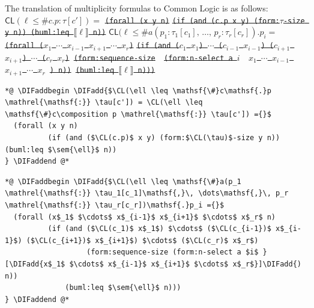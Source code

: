 \documentclass[10pt,fleqn,final]{scrreprt}
\newcommand*{\CL}{\ensuremath{\mathsf{CL}}\xspace}
\newenvironment{definitions}[0]{\medskip }{}
\newcommand{\composition}{\raisebox{0.2pt}{\begin{sideways}\fontsize{6pt}{6pt}\selectfont$\blacklozenge$\end{sideways}}}
\newcommand{\sem}[1]{\mathopen\llbracket#1\mathclose\rrbracket}
\newcommand{\white}[1]{{\color{white}{#1}}}
\newcommand{\qqquad}{\white{x}\qquad}
\providecommand{\DIFadd}[1]{{\protect\color{blue}\uwave{#1}}} %
\providecommand{\DIFdel}[1]{{\protect\color{red}\sout{#1}}}                      %
\providecommand{\DIFaddbegin}{} %
\providecommand{\DIFaddend}{} %
\providecommand{\DIFdelbegin}{} %
\providecommand{\DIFdelend}{} %
\begin{document}
\begin{definitions}
The translation of multiplicity formulas to Common Logic is as follows:
\DIFdelbegin %
\DIFdel{$\CL(\ell \leq \mathsf{\#}c\mathsf{.}p \mathrel{\mathsf{:}} \tau[c']) =$}%
\texttt{\DIFdel{(forall (x y n)}}%
\texttt{\DIFdel{(if (and (c.p x y) (form:$\tau$-size y n)) (buml:leq $\sem{\ell}$ n))}}
\DIFdel{$\CL(\ell \leq \mathsf{\#}a(p_1 \mathrel{\mathsf{:}} \tau_1[c_1]\mathsf{,}\, \dots\mathsf{,}\, p_r \mathrel{\mathsf{:}} \tau_r[c_r])\mathsf{.}p_i=$}%
\texttt{\DIFdel{(forall ($x_1$ $\cdots$ $x_{i-1}$ $x_{i+1}$ $\cdots$ $x_r$)}}%
\texttt{\DIFdel{(if (and ($c_1$ $x_1$) $\cdots$ ($c_{i-1}$ $x_{i-1}$) ($c_{i+1}$ $x_{i+1}$) $\cdots$ ($c_r$ $x_r$)}%
\DIFdel{(form:sequence-size }%
\DIFdel{(form:n-select a $i$ }%
\DIFdel{$x_1$ $\cdots$ $x_{i-1}$ $x_{i+1}$ $\cdots$ $x_r$}%
\DIFdel{) n))}%
\DIFdel{(buml:leq $\sem{\ell}$ n)))}}%
\DIFdelend 

\begin{lstlisting}[language=clif, mathescape]
*@ \DIFaddbegin \DIFadd{$\CL(\ell \leq \mathsf{\#}c\mathsf{.}p \mathrel{\mathsf{:}} \tau[c']) = \CL(\ell \leq \mathsf{\#}c\composition p \mathrel{\mathsf{:}} \tau[c']) ={}$
  (forall (x y n)
          (if (and ($\CL(c.p)$ x y) (form:$\CL(\tau)$-size y n)) (buml:leq $\sem{\ell}$ n))
} \DIFaddend @*
\end{lstlisting}

\begin{lstlisting}[language=clif, mathescape]
*@ \DIFaddbegin \DIFadd{$\CL(\ell \leq \mathsf{\#}a(p_1 \mathrel{\mathsf{:}} \tau_1[c_1]\mathsf{,}\, \dots\mathsf{,}\, p_r \mathrel{\mathsf{:}} \tau_r[c_r])\mathsf{.}p_i ={}$
  (forall (x$_1$ $\cdots$ x$_{i-1}$ x$_{i+1}$ $\cdots$ x$_r$ n)
          (if (and ($\CL(c_1)$ x$_1$) $\cdots$ ($\CL(c_{i-1})$ x$_{i-1}$) ($\CL(c_{i+1})$ x$_{i+1}$) $\cdots$ ($\CL(c_r)$ x$_r$)
                   (form:sequence-size (form:n-select a $i$ }[\DIFadd{x$_1$ $\cdots$ x$_{i-1}$ x$_{i+1}$ $\cdots$ x$_r$}]\DIFadd{) n))
              (buml:leq $\sem{\ell}$ n)))
} \DIFaddend @*
\end{lstlisting}


\end{definitions}
\end{document}
